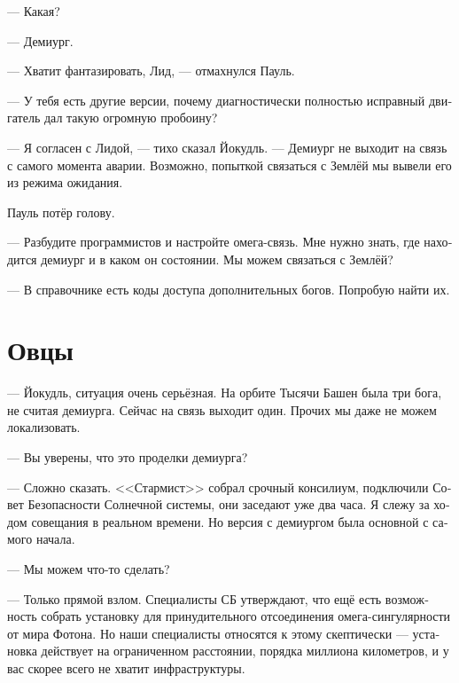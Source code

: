 \documentclass[a4paper,10pt,fleqn]{book}\usepackage{polyglossia}\setdefaultlanguage[babelshorthands=true]{russian}\setotherlanguage{english}\defaultfontfeatures{Ligatures=TeX,Mapping=tex-text}\usepackage{xcolor}\newcommand{\ml}[3]{#2}
\begin{document}
--- Какая?

--- Демиург.

--- Хватит фантазировать, Лид, --- отмахнулся Пауль.

--- У тебя есть другие версии, почему диагностически полностью исправный двигатель дал такую огромную пробоину?

--- Я согласен с Лидой, --- тихо сказал Йокудль.
--- Демиург не выходит на связь с самого момента аварии.
Возможно, попыткой связаться с Землёй мы вывели его из режима ожидания.

Пауль потёр голову.

--- Разбудите программистов и настройте омега-связь.
Мне нужно знать, где находится демиург и в каком он состоянии.
Мы можем связаться с Землёй?

--- В справочнике есть коды доступа дополнительных богов.
Попробую найти их.

\section{Овцы}

--- Йокудль, ситуация очень серьёзная.
На орбите Тысячи Башен была три бога, не считая демиурга.
\ml{$0$}
{Сейчас на связь выходит один.}
{Now we can contact only one of them.}
\ml{$0$}
{Прочих мы даже не можем локализовать.}
{The others we can't even locate.''}

\ml{$0$}
{--- Вы уверены, что это проделки демиурга?}
{``Are you sure the demiurge has something to do with that?''}

\ml{$0$}
{--- Сложно сказать.}
{``We're not.}
\ml{$0$}
{<<Стармист>> собрал срочный консилиум, подключили Совет Безопасности Солнечной системы, они заседают уже два часа.}
{\textsc{Starmist} has summoned an emergency meeting, even Solar Security Council are invited, they've been in session for nearly two hours now.}
\ml{$0$}
{Я слежу за ходом совещания в реальном времени.}
{I'm following all proceedings of the meeting in real time.}
\ml{$0$}
{Но версия с демиургом была основной с самого начала.}
{But interference of the demiurge was our best guess from the beginning.''}

\ml{$0$}
{--- Мы можем что-то сделать?}
{``What can we do?''}

\ml{$0$}
{--- Только прямой взлом.}
{``Your only option is to hack that thing.}
\ml{$0$}
{Специалисты СБ утверждают, что ещё есть возможность собрать установку для принудительного отсоединения омега-сингулярности от мира Фотона.}
{SSC specialists say that you have the opportunity to assembly a machine which can sever the connection between omega singularity and Photon Universe.}
\ml{$0$}
{Но наши специалисты относятся к этому скептически --- установка действует на ограниченном расстоянии, порядка миллиона километров, и у вас скорее всего не хватит инфраструктуры.}
{But our specialists are skeptical, because the machine has limited range, about one million kilometers, and most likely your infrastructure is insufficient.''}
\end{document}
